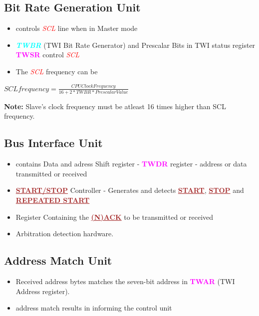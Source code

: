 \documentclass{article}
\newcommand{\bitFormat}[1]{\emph{\textbf{\textcolor{cyan}{#1}}}}
\newcommand{\regFormat}[1]{\textbf{\textcolor{magenta}{#1}}}
\newcommand{\pinFormat}[1]{\emph{\textcolor{red}{#1}}}
\newcommand{\iicFormat}[1]{\textbf{\textcolor{brown}{\underline{#1}}}}
\begin{document}
\subsection{Bit Rate Generation Unit}
\begin{itemize}
    \item controls \pinFormat{SCL} line when in Master mode
    \item \bitFormat{TWBR} (TWI Bit Rate Generator) and Prescalar Bits in TWI status register \regFormat{TWSR} control \pinFormat{SCL}
    \item The \pinFormat{SCL} frequency can be
\end{itemize}
\begin{center}
    $SCL frequency = \frac{CPU Clock Frequency}{16 + 2 * TWBR * Prescalar Value}$
\end{center}
\textbf{Note: } Slave’s clock frequency must be atleast 16 times higher than SCL frequency.

\subsection{Bus Interface Unit}
\begin{itemize}
    \item contains Data and adress Shift register - \regFormat{TWDR} register - address or data transmitted or received
    \item \iicFormat{START/STOP} Controller - Generates and detects \iicFormat{START}, \iicFormat{STOP} and \iicFormat{REPEATED START}
    \item Register Containing the \iicFormat{(N)ACK} to be transmitted or received
    \item Arbitration detection hardware.
\end{itemize}

\subsection{Address Match Unit}
\begin{itemize}
    \item Received address bytes matches the seven-bit address in \regFormat{TWAR} (TWI Address register).
    \item address match results in informing the control unit
\end{itemize}
\end{document}

